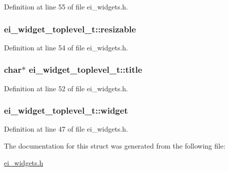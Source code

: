 Definition at line 55 of file ei\-\_\-widgets.\-h.

\hypertarget{structei__widget__toplevel__t_a2959bf91c46bfbf8772cd7974168fd1b}{
\subsubsection[{resizable}]{ ei\-\_\-widget\-\_\-toplevel\-\_\-t\-::resizable}}\label{structei__widget__toplevel__t_a2959bf91c46bfbf8772cd7974168fd1b}


Definition at line 54 of file ei\-\_\-widgets.\-h.

\hypertarget{structei__widget__toplevel__t_a2dba56e4fa0df714a546e4175fe3563e}{
\subsubsection[{title}]{\setlength{\rightskip}{0pt plus 5cm}char$\ast$ ei\-\_\-widget\-\_\-toplevel\-\_\-t\-::title}}\label{structei__widget__toplevel__t_a2dba56e4fa0df714a546e4175fe3563e}


Definition at line 52 of file ei\-\_\-widgets.\-h.

\hypertarget{structei__widget__toplevel__t_a3babaea121cf413ae2020cea768479b0}{
\subsubsection[{widget}]{ ei\-\_\-widget\-\_\-toplevel\-\_\-t\-::widget}}\label{structei__widget__toplevel__t_a3babaea121cf413ae2020cea768479b0}


Definition at line 47 of file ei\-\_\-widgets.\-h.



The documentation for this struct was generated from the following file\-:\begin{DoxyCompactItemize}
\item 
\hyperlink{ei__widgets_8h}{ei\-\_\-widgets.\-h}\end{DoxyCompactItemize}
